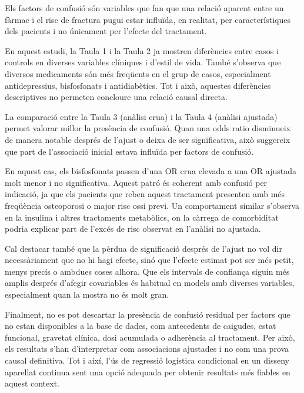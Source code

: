\documentclass[
]{article}
\begin{document}
Els factors de confusió són variables que fan que una relació aparent
entre un fàrmac i el risc de fractura pugui estar influïda, en realitat,
per característiques dels pacients i no únicament per l'efecte del
tractament.

En aquest estudi, la Taula 1 i la Taula 2 ja mostren diferències entre
casos i controls en diverses variables clíniques i d'estil de vida.
També s'observa que diversos medicaments són més freqüents en el grup de
casos, especialment antidepressius, bisfosfonats i antidiabètics. Tot i
això, aquestes diferències descriptives no permeten concloure una
relació causal directa.

La comparació entre la Taula 3 (anàlisi crua) i la Taula 4 (anàlisi
ajustada) permet valorar millor la presència de confusió. Quan una odds
ratio disminueix de manera notable després de l'ajust o deixa de ser
significativa, això suggereix que part de l'associació inicial estava
influïda per factors de confusió.

En aquest cas, els bisfosfonats passen d'una OR crua elevada a una OR
ajustada molt menor i no significativa. Aquest patró és coherent amb
confusió per indicació, ja que els pacients que reben aquest tractament
presenten amb més freqüència osteoporosi o major risc ossi previ. Un
comportament similar s'observa en la insulina i altres tractaments
metabòlics, on la càrrega de comorbiditat podria explicar part de
l'excés de risc observat en l'anàlisi no ajustada.

Cal destacar també que la pèrdua de significació després de l'ajust no
vol dir necessàriament que no hi hagi efecte, sinó que l'efecte estimat
pot ser més petit, menys precís o ambdues coses alhora. Que els
intervals de confiança siguin més amplis després d'afegir covariables és
habitual en models amb diverses variables, especialment quan la mostra
no és molt gran.

Finalment, no es pot descartar la presència de confusió residual per
factors que no estan disponibles a la base de dades, com antecedents de
caigudes, estat funcional, gravetat clínica, dosi acumulada o adherència
al tractament. Per això, els resultats s'han d'interpretar com
associacions ajustades i no com una prova causal definitiva. Tot i així,
l'ús de regressió logística condicional en un disseny aparellat continua
sent una opció adequada per obtenir resultats més fiables en aquest
context.
\end{document}
